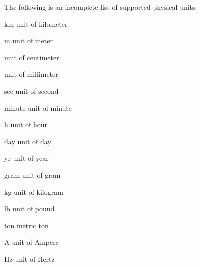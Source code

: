 The following is an incomplete list of supported physical units:

\begin{datadesc}{km}
unit of kilometer
\end{datadesc}

\begin{datadesc}{m}
unit of meter
\end{datadesc}

\begin{datadesc}{cm}
unit of centimeter
\end{datadesc}

\begin{datadesc}{mm}
unit of millimeter
\end{datadesc}

\begin{datadesc}{sec}
unit of second
\end{datadesc}

\begin{datadesc}{minute}
unit of minute
\end{datadesc}

\begin{datadesc}{h}
unit of hour
\end{datadesc}

\begin{datadesc}{day}
unit of day
\end{datadesc}

\begin{datadesc}{yr}
unit of year
\end{datadesc}

\begin{datadesc}{gram}
unit of gram
\end{datadesc}

\begin{datadesc}{kg}
unit of kilogram
\end{datadesc}

\begin{datadesc}{lb}
unit of pound
\end{datadesc}

\begin{datadesc}{ton}
metric ton
\end{datadesc}

\begin{datadesc}{A}
unit of Ampere
\end{datadesc}

\begin{datadesc}{Hz}
unit of Hertz
\end{datadesc}


